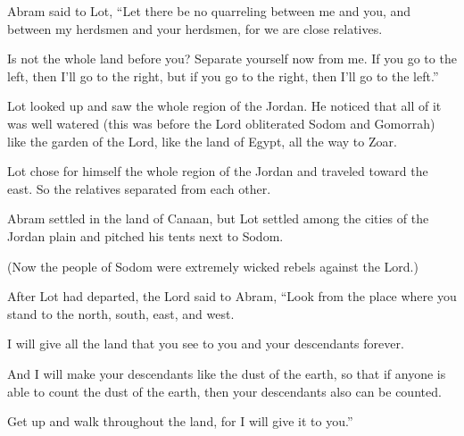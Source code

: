 \begin{scripture}
 Abram said to Lot, ``Let there be no quarreling between me and you, and between my herdsmen and your herdsmen, for we are close relatives.
 Is not the whole land before you? Separate yourself now from me. If you go to the left, then I'll go to the right, but if you go to the right, then I'll go to the left.''
\everypar{}

 Lot looked up and saw the whole region of the Jordan. He noticed that all of it was well watered (this was before the Lord obliterated Sodom and Gomorrah) like the garden of the Lord, like the land of Egypt, all the way to Zoar.
\everypar{}

 Lot chose for himself the whole region of the Jordan and traveled toward the east. So the relatives separated from each other.
 Abram settled in the land of Canaan, but Lot settled among the cities of the Jordan plain and pitched his tents next to Sodom.
 (Now the people of Sodom were extremely wicked rebels against the Lord.)
\everypar{}

 After Lot had departed, the Lord said to Abram, ``Look from the place where you stand to the north, south, east, and west.
 I will give all the land that you see to you and your descendants forever.
 And I will make your descendants like the dust of the earth, so that if anyone is able to count the dust of the earth, then your descendants also can be counted.
 Get up and walk throughout the land, for I will give it to you.''
\everypar{}


\end{scripture}
